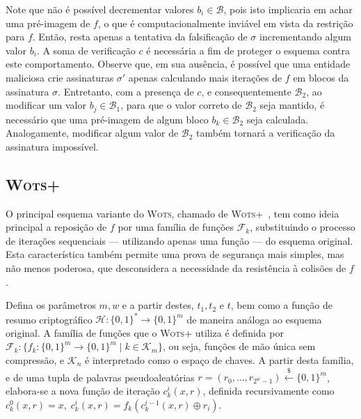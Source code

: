 \documentclass{article}
\newcommand{\binwds}[1]{\{0, 1\}^{#1}}
\begin{document}
Note que não é possível decrementar valores $b_i \in \mathcal{B}$, pois isto implicaria em achar uma pré-imagem de $f$, o que é computacionalmente inviável em vista da restrição para $f$. Então, resta apenas a tentativa da falsificação de $\sigma$ incrementando algum valor $b_i$. A soma de verificação $c$ é necessária a fim de proteger o esquema contra este comportamento. Observe que, em sua ausência, é possível que uma entidade maliciosa crie assinaturas $\sigma'$ apenas calculando mais iterações de $f$ em blocos da assinatura $\sigma$. Entretanto, com a presença de $c$, e consequentemente $\mathcal{B}_2$, ao modificar um valor $b_j \in \mathcal{B}_1$, para que o valor correto de $\mathcal{B}_2$ seja mantido, é necessário que uma pré-imagem de algum bloco $b_k \in \mathcal{B}_2$ seja calculada. Analogamente, modificar algum valor de $\mathcal{B}_2$ também tornará a verificação da assinatura impossível.

\subsection{\textsc{Wots+}}

O principal esquema variante do \textsc{Wots}, chamado de \textsc{Wots+}~\cite{cryptoeprint:2017:965}, tem como ideia principal a reposição de $f$ por uma família de funções $\mathcal{F}_k$, substituindo o processo de iterações sequenciais --- utilizando apenas uma função --- do esquema original. Esta característica também permite uma prova de segurança mais simples, mas não menos poderosa, que desconsidera a necessidade da resistência à colisões de $f$.

Defina os parâmetros $m, w$ e a partir destes, $t_1, t_2 \text{ e } t$, bem como a função de resumo criptográfico $\mathcal{H} : \binwds{*} \longrightarrow \binwds{m}$ de maneira análoga ao esquema original. A família de funções que o \textsc{Wots+} utiliza é definida por $\mathcal{F}_k : \{f_k : \binwds{m} \longrightarrow \binwds{m} \mid k \in \mathcal{K}_m\}$, ou seja, funções de mão única sem compressão, e $\mathcal{K}_n$ é interpretado como o espaço de chaves. A partir desta família, e de uma tupla de palavras pseudoaleatórias $r = (r_0, \dots, r_{2^w - 1}) \stackrel{\$}{\longleftarrow} \binwds{m}$, elabora-se a nova função de iteração $c^{i}_{k}(x, r)$, definida recursivamente como $c^{0}_{k}(x, r) = x, \; c^{i}_{k}(x, r) = f_k(c^{i-1}_{k}(x, r) \oplus r_i)$.
\end{document}

